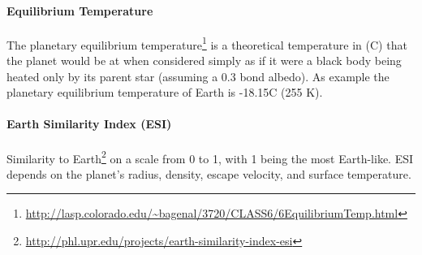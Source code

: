 \paragraph{Equilibrium Temperature}
The planetary equilibrium temperature\footnote{\url{http://lasp.colorado.edu/~bagenal/3720/CLASS6/6EquilibriumTemp.html}} is a theoretical temperature in (\degree C) that the planet would be at when considered simply as if it were a black body being heated only by its parent star (assuming a 0.3 bond albedo). As example the planetary equilibrium temperature of Earth is -18.15\degree C (255 K).

\paragraph{Earth Similarity Index (ESI)}
Similarity to Earth\footnote{\url{http://phl.upr.edu/projects/earth-similarity-index-esi}} on a scale from 0 to 1, with 1 being the most Earth-like. ESI depends on the planet's radius, density, escape velocity, and surface temperature.

